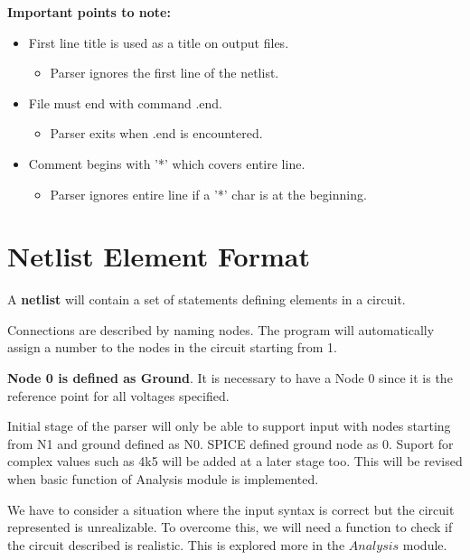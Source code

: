 \documentclass[a4paper, titlepage]{article}
\begin{document}
    \textbf{Important points to note:}
    \begin{itemize}
        \item First line {\selectfont title } is used as a title on output files.
        \begin{itemize}
            \item Parser ignores the first line of the netlist.
        \end{itemize}
        \item File must end with command {\selectfont .end}.
        \begin{itemize}
            \item Parser exits when {\selectfont .end} is encountered.
        \end{itemize}
        \item Comment begins with '*' which covers entire line.
        \begin{itemize}
            \item Parser ignores entire line if a '*' char is at the beginning.
        \end{itemize}
    \end{itemize}

    \section{Netlist Element Format}
    A \textbf{netlist} will contain a set of statements defining elements in a circuit.
    \par
    Connections are described by naming nodes. The program will automatically assign a number to the nodes in the circuit
    starting from 1. 
    \par
    \textbf{Node 0 is defined as Ground}. It is necessary to have a Node 0 since it is the reference point for 
    all voltages specified.
    \par
    Initial stage of the parser will only be able to support input with nodes starting from N1 and ground defined as N0.
    SPICE defined ground node as $0$. Suport for complex values such as 4k5 will be added at a later stage too.
    This will be revised when basic function of Analysis module is implemented.
    \par
    We have to consider a situation where the input syntax is correct but the circuit represented is unrealizable.
    To overcome this, we will need a function to check if the circuit described is realistic. This is explored more
    in the $Analysis$ module.
\end{document}
